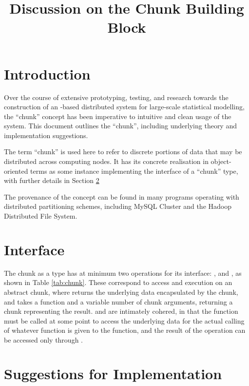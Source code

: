 \documentclass[10pt, a4paper]{article}
\begin{document}
\title{Discussion on the Chunk Building Block}
  
\maketitle

\section{Introduction} %

Over the course of extensive prototyping, testing, and research towards the construction of an \R{}-based distributed system for large-scale statistical modelling, the ``chunk'' concept has been imperative to intuitive and clean usage of the system.
This document outlines the ``chunk'', including underlying theory and implementation suggestions.

The term ``chunk'' is used here to refer to discrete portions of data that may be distributed across computing nodes.
It has its concrete realisation in object-oriented terms as some instance implementing the interface of a ``chunk'' type, with further details in Section \ref{int}

The provenance of the concept can be found in many programs operating with distributed partitioning schemes, including MySQL Cluster and the Hadoop Distributed File System\cite{shvachko2010hadoop}\cite{kruckenberg2005mysql}.

\section{Interface}\label{int}

The chunk as a type has at minimum two operations for its interface: , and , as shown in Table \ref{tab:chunk}.
These correspond to access and execution on an abstract chunk, where  returns the underlying data encapsulated by the chunk, and  takes a function and a variable number of chunk arguments, returning a chunk representing the result.
 and  are intimately cohered, in that the  function must be called at some point to access the underlying data for the actual calling of whatever function is given to the  function, and the result of the  operation can be accessed only through .

\section{Suggestions for Implementation}
\end{document}
